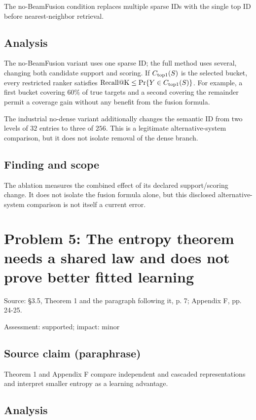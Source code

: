 \documentclass[11pt]{article}
\begin{document}
The no-BeamFusion condition replaces multiple sparse IDs with the single top ID before nearest-neighbor retrieval.

\subsection*{Analysis}

The no-BeamFusion variant uses one sparse ID; the full method uses several, changing both candidate support and scoring. If \(C_{\rm top1}(S)\) is the selected bucket, every restricted ranker satisfies \(\operatorname{Recall@K}\le\Pr\{Y\in C_{\rm top1}(S)\}\). For example, a first bucket covering \(60\%\) of true targets and a second covering the remainder permit a coverage gain without any benefit from the fusion formula.

The industrial no-dense variant additionally changes the semantic ID from two levels of \(32\) entries to three of \(256\). This is a legitimate alternative-system comparison, but it does not isolate removal of the dense branch.

\subsection*{Finding and scope}

The ablation measures the combined effect of its declared support/scoring change. It does not isolate the fusion formula alone, but this disclosed alternative-system comparison is not itself a current error.

\section*{Problem 5: The entropy theorem needs a shared law and does not prove better fitted learning}

Source: §3.5, Theorem 1 and the paragraph following it, p. 7; Appendix F, pp. 24-25.

Assessment: supported; impact: minor

\subsection*{Source claim (paraphrase)}

Theorem 1 and Appendix F compare independent and cascaded representations and interpret smaller entropy as a learning advantage.

\subsection*{Analysis}
\end{document}
